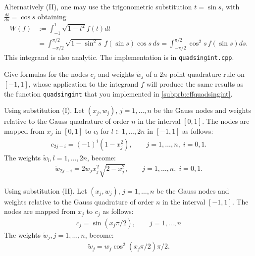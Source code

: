 \begin{problem}
\begin{subproblem}[3]
\begin{solution}
   Alternatively (II), one may use the trigonometric substitution $t = \sin s$, with $\frac{dt}{ds} = \cos s$ obtaining
   \begin{align*}
    W(f) & := \int_{-1}^1 \sqrt{1 - t^2} f(t) dt \\
    & = \int_{-\pi / 2}^{\pi / 2} \sqrt{1 - \sin^2\! s}\, f(\sin s) \cos s\,ds = \int_{-\pi / 2}^{\pi / 2} \cos^2\! s \, f(\sin s) ds.
   \end{align*}
   This integrand is also analytic.
   The \Cpp{} implementation is in \verb|quadsingint.cpp|.
  \end{solution}

 \end{subproblem}

 \begin{subproblem}[2]
  Give formulas for the nodes $c_j$ and weights $\tilde{w}_j$ of a $2n$-point quadrature rule on $[-1,1]$, whose application to the integrand $f$ will produce the same results as the function \verb|quadsingint| that you implemented in \ref{subprb:effquadsingint}.
  
  \cprotEnv \begin{solution}
   Using substitution (I). Let $(x_j, w_j)$, $j=1,\dots,n$ be the Gauss nodes and weights relative to the Gauss quadrature of order $n$ in the interval $[0,1]$. The nodes are mapped from $x_j$ in $[0,1]$ to $c_l$ for $l \in 1,\dots,2n$ in $[-1,1]$ as follows:
    \begin{align*}
     c_{2j-i}  = (-1)^i (1-x_j^2),\qquad j=1,\dots,n,\;i=0,1.  
      \end{align*}
    The weights $\tilde{w}_{l}, l = 1,\dots,2n$, become:
    \begin{align*}
     \tilde{w}_{2j-i} = 2 w_j x_j^2 \sqrt{2 - x_j^2},\qquad j=1,\dots,n,\;i=0,1.
    \end{align*}
    
   Using substitution (II). Let $(x_j, w_j)$, $j=1,\dots,n$ be the Gauss nodes and weights relative to the Gauss quadrature of order $n$ in the interval $[-1,1]$.  The nodes are mapped from $x_j$ to $c_j$  as follows:
    \begin{align*}
     c_j = \sin(x_j  \pi / 2),\qquad j=1,\dots,n
    \end{align*}
    The weights $\tilde{w}_{j}, j = 1,\dots,n$, become:
    \begin{align*}
     \tilde{w}_{j} = w_j \cos^2(x_j  \pi / 2) \pi / 2.
    \end{align*}
  \end{solution}


\end{subproblem}
\end{problem}
